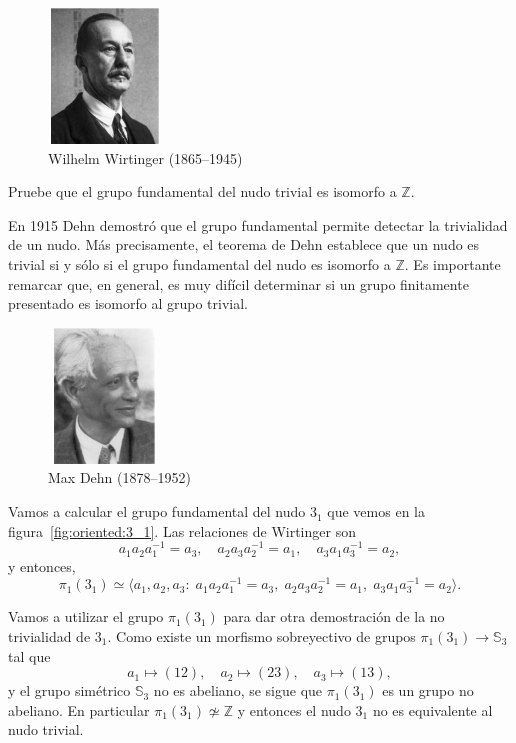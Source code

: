\documentclass[graybox]{svmult}
\newcommand{\Z}{\mathbb{Z}}
\newcommand{\Sym}{\mathbb{S}}
\begin{document}
    \begin{figure}[h]
		\centering
        \includegraphics[width=30mm,height=36mm]{images/wirtinger}
        \caption{Wilhelm Wirtinger (1865--1945)}
    \end{figure}

\begin{exercise}
    Pruebe que el grupo fundamental del nudo trivial es isomorfo a $\Z$.
\end{exercise}

	En 1915 Dehn demostró que el grupo fundamental permite detectar la
	trivialidad de un nudo. Más precisamente, el teorema de Dehn establece que
	un nudo es trivial si y sólo si el grupo fundamental del nudo es isomorfo a
	$\Z$. Es importante remarcar que, en general, es muy difícil determinar si
	un grupo finitamente presentado es isomorfo al grupo trivial. 

    \begin{figure}[h]
		\centering
        \includegraphics[width=30mm,height=36mm]{images/dehn}
        \caption{Max Dehn (1878--1952)}
    \end{figure}

\begin{example}
    \label{exa:3_1}
    Vamos a calcular el grupo fundamental del nudo $3_1$ que vemos en la
    figura~\ref{fig:oriented:3_1}. Las relaciones de Wirtinger son
    \begin{equation}
        a_1a_2a_1^{-1}=a_3,\quad
        a_2a_3a_2^{-1}=a_1,\quad
        a_3a_1a_3^{-1}=a_2,
    \end{equation}
    y entonces, 
    \[
        \pi_1(3_1)\simeq\langle a_1,a_2,a_3:\;
        a_1a_2a_1^{-1}=a_3,\;a_2a_3a_2^{-1}=a_1,\;a_3a_1a_3^{-1}=a_2\rangle.
    \]

    Vamos a utilizar el grupo $\pi_1(3_1)$ para dar otra demostración de la no
    trivialidad de $3_1$.  Como existe un morfismo sobreyectivo de grupos
    $\pi_1(3_1)\to\Sym_3$ tal que 
    \[
        a_1\mapsto(12),\quad
        a_2\mapsto(23),\quad
        a_3\mapsto(13),
    \]
    y el grupo simétrico $\Sym_3$ no es abeliano, se sigue que
    $\pi_1(3_1)$ es un grupo no abeliano. En particular
    $\pi_1(3_1)\not\simeq\Z$ y entonces el nudo $3_1$ no es equivalente al nudo
    trivial. 
\end{example}
\end{document}
